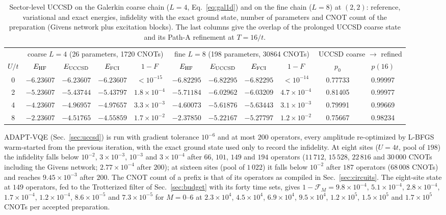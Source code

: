 \documentclass[a4paper,11pt,noarxiv]{quantumarticle}
\begin{document}
\begin{table}[t]
  \caption{Sector-level UCCSD on the Galerkin coarse chain ($L=4$,
  Eq.~\eqref{eq:gal1d}) and on the fine chain ($L=8$) at $(2,2)$:
  reference, variational and exact energies, infidelity with the exact
  ground state, number of parameters and CNOT count of the preparation
  (Givens network plus excitation blocks).  The last columns give the
  overlap of the prolonged UCCSD coarse state and its Path-A refinement at
  $T=16/t$.}
  \label{tab:uccsd}
  \centering\scriptsize
  \setlength{\tabcolsep}{3pt}
  \begin{tabular}{c|cccc|cccc|cc}
  \toprule
  & \multicolumn{4}{c|}{coarse $L=4$ (26 parameters, 1720 CNOTs)} & \multicolumn{4}{c|}{fine $L=8$ (198 parameters, 30864 CNOTs)} & \multicolumn{2}{c}{UCCSD coarse $\to$ refined}\\
  $U/t$ & $E_{\rm HF}$ & $E_{\rm UCCSD}$ & $E_{\rm FCI}$ & $1-F$ & $E_{\rm HF}$ & $E_{\rm UCCSD}$ & $E_{\rm FCI}$ & $1-F$ & $p_0$ & $p(16)$\\
  \midrule
  0 & $-6.23607$ & $-6.23607$ & $-6.23607$ & $<10^{-15}$ & $-6.82295$ & $-6.82295$ & $-6.82295$ & $<10^{-14}$ & 0.77733 & 0.99997\\
  2 & $-5.23607$ & $-5.43744$ & $-5.43797$ & $1.8\times10^{-4}$ & $-5.71184$ & $-6.02962$ & $-6.03209$ & $4.7\times10^{-4}$ & 0.81405 & 0.99977\\
  4 & $-4.23607$ & $-4.96957$ & $-4.97657$ & $3.3\times10^{-3}$ & $-4.60073$ & $-5.61876$ & $-5.63443$ & $3.1\times10^{-3}$ & 0.79991 & 0.99669\\
  8 & $-2.23607$ & $-4.51765$ & $-4.55859$ & $1.7\times10^{-2}$ & $-2.37850$ & $-5.22167$ & $-5.27797$ & $1.2\times10^{-2}$ & 0.75667 & 0.98234\\
  \bottomrule
  \end{tabular}
\end{table}

ADAPT-VQE (Sec.~\ref{sec:uccsd}) is run with gradient tolerance $10^{-6}$
and at most $200$ operators, every amplitude re-optimized by L-BFGS
warm-started from the previous iteration, with the exact ground state used
only to record the infidelity.  At eight sites ($U=4t$, pool of $198$) the
infidelity falls below $10^{-2}$, $3\times10^{-3}$, $10^{-3}$ and
$3\times10^{-4}$ after $66$, $101$, $149$ and $194$ operators ($11\,712$,
$15\,528$, $22\,816$ and $30\,000$ CNOTs including the Givens network;
$2.77\times10^{-4}$ after $200$); at sixteen sites (pool of $1\,022$) it
falls below $10^{-2}$ after $187$ operators ($68\,008$ CNOTs) and reaches
$9.45\times10^{-3}$ after $200$.  The CNOT count of a prefix is that of
its operators as compiled in Sec.~\ref{sec:circuits}.  The eight-site
state at $149$ operators, fed to the Trotterized filter of
Sec.~\ref{sec:budget} with its forty time sets, gives
$1-\mathcal F_M=9.8\times10^{-4}$, $5.1\times10^{-4}$,
$2.8\times10^{-4}$, $1.7\times10^{-4}$, $1.2\times10^{-4}$,
$8.6\times10^{-5}$ and $7.3\times10^{-5}$ for $M=0$--$6$ at
$2.3\times10^4$, $4.5\times10^4$, $6.9\times10^4$, $9.5\times10^4$,
$1.2\times10^5$, $1.5\times10^5$ and $1.7\times10^5$ CNOTs per accepted
preparation.
\end{document}
